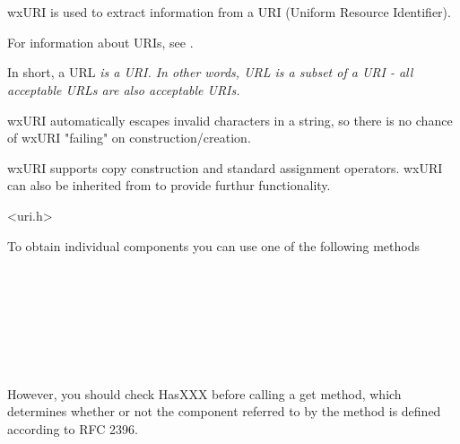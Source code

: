 
\section{}\label{wxuri}

wxURI is used to extract information from
a URI (Uniform Resource Identifier).

For information about URIs, see 
.

In short, a URL \em{is} a URI.  In other
words, URL is a subset of a URI - all 
acceptable URLs are also acceptable URIs.

wxURI automatically escapes invalid characters in a string,
so there is no chance of wxURI "failing" on construction/creation.

wxURI supports copy construction and standard assignment
operators.  wxURI can also be inherited from to provide
furthur functionality.




<uri.h>


\label{obtainingwxuricomponents}

To obtain individual components you can use 
one of the following methods

\\
\\
\\
\\
\\
\\

However, you should check HasXXX before
calling a get method, which determines whether or not the component referred
to by the method is defined according to RFC 2396.

